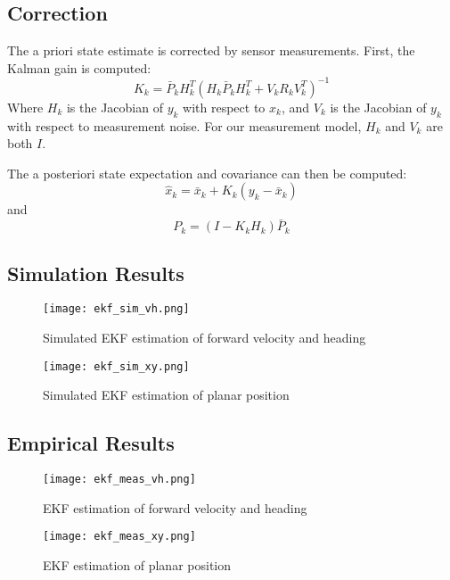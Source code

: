 \documentclass[11pt]{article} %
\begin{document}
\subsection{Correction}

The a priori state estimate is corrected by sensor measurements.  First, the Kalman gain is computed:
\begin{equation}
K_k = \bar{P}_k H_k^T ( H_k \bar{P}_k H_k^T + V_k R_k V_k^T ) ^{-1}
\end{equation}
Where $H_k$ is the Jacobian of $y_k$ with respect to $x_k$, and $V_k$ is the Jacobian of $y_k$ with respect to measurement noise.   For our measurement model, $H_k$ and $V_k$ are both $I$.

The a posteriori state expectation and covariance can then be computed:
\begin{equation}
\hat{x}_k = \bar{x}_k + K_k (y_k - \bar{x}_k)
\end{equation}
and
\begin{equation}
P_k = (I - K_k H_k) \bar{P}_k
\end{equation}

\clearpage
\subsection{Simulation Results}

\begin{figure}[hbt]
 \centering
 \texttt{[image: ekf\_sim\_vh.png]}
 \caption{Simulated EKF estimation of forward velocity and heading}
 \label{ekf_s_vh}
\end{figure}

\begin{figure}[hbt]
  \centering
  \texttt{[image: ekf\_sim\_xy.png]}
  \caption{Simulated EKF estimation of planar position}
  \label{ekf_s_xy}
\end{figure}

\clearpage

\subsection{Empirical Results}

\begin{figure} [hbt]
 \centering
 \texttt{[image: ekf\_meas\_vh.png]} 
 \caption{EKF estimation of forward velocity and heading}
 \label{ekf_m_vh}
\end{figure}

\begin{figure} [hbt]
 \centering
 \texttt{[image: ekf\_meas\_xy.png]}
 \caption{EKF estimation of planar position}
 \label{ekf_m_xy}
\end{figure}
\end{document}
